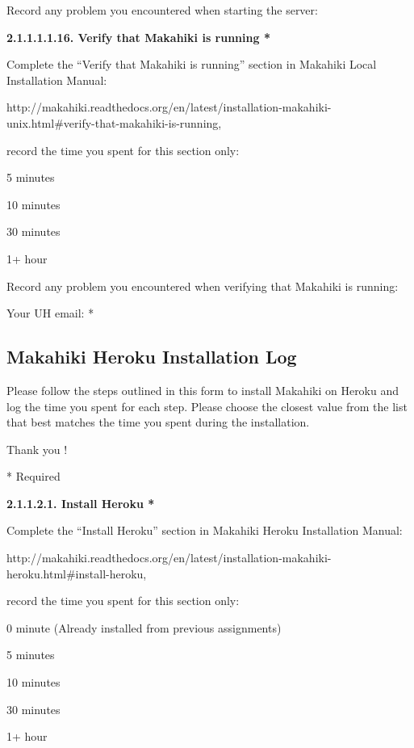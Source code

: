 Record any problem you encountered when starting the server: \underline{\hspace{4cm}}

{\bf 2.1.1.1.1.16. Verify that Makahiki is running *}

Complete the ``Verify that Makahiki is running'' section in Makahiki Local Installation Manual:

http://makahiki.readthedocs.org/en/latest/installation-makahiki-unix.html\#verify-that-makahiki-is-running, 

record the time you spent for this section only:

\begin{radiobutton}
\item 5 minutes
\item  10 minutes
\item  30 minutes
\item  1+ hour
\end{radiobutton}

Record any problem you encountered when verifying that Makahiki is running: \underline{\hspace{3cm}}

Your UH email: * \underline{\hspace{4cm}}

\subsection{Makahiki Heroku Installation Log}

Please follow the steps outlined in this form to install Makahiki on Heroku and log the time you spent for each step.
Please choose the closest value from the list that best matches the time you spent during the installation.

Thank you !

* Required

{\bf 2.1.1.2.1. Install Heroku *}

Complete the ``Install Heroku'' section in Makahiki Heroku Installation Manual:

http://makahiki.readthedocs.org/en/latest/installation-makahiki-heroku.html\#install-heroku, 

record the time you spent for this section only:

\begin{radiobutton}
\item 0 minute (Already installed from previous assignments)
\item 5 minutes
\item  10 minutes
\item  30 minutes
\item  1+ hour
\end{radiobutton}


